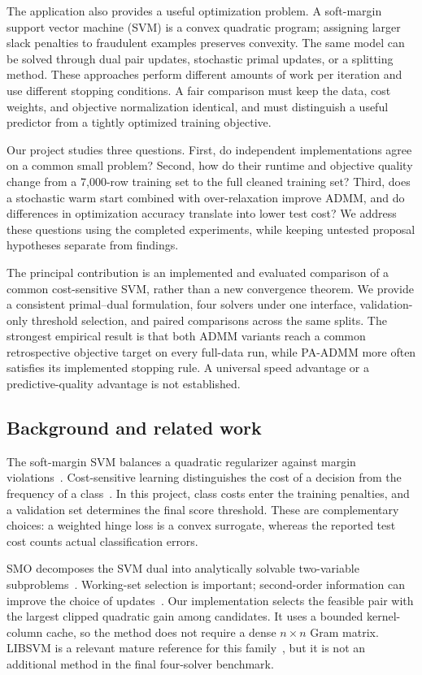 \documentclass{article}
\begin{document}
The application also provides a useful optimization problem. A soft-margin support vector machine (SVM) is a convex quadratic program; assigning larger slack penalties to fraudulent examples preserves convexity. The same model can be solved through dual pair updates, stochastic primal updates, or a splitting method. These approaches perform different amounts of work per iteration and use different stopping conditions. A fair comparison must keep the data, cost weights, and objective normalization identical, and must distinguish a useful predictor from a tightly optimized training objective.

Our project studies three questions. First, do independent implementations agree on a common small problem? Second, how do their runtime and objective quality change from a 7,000-row training set to the full cleaned training set? Third, does a stochastic warm start combined with over-relaxation improve ADMM, and do differences in optimization accuracy translate into lower test cost? We address these questions using the completed experiments, while keeping untested proposal hypotheses separate from findings.

The principal contribution is an implemented and evaluated comparison of a common cost-sensitive SVM, rather than a new convergence theorem. We provide a consistent primal--dual formulation, four solvers under one interface, validation-only threshold selection, and paired comparisons across the same splits. The strongest empirical result is that both ADMM variants reach a common retrospective objective target on every full-data run, while PA-ADMM more often satisfies its implemented stopping rule. A universal speed advantage or a predictive-quality advantage is not established.

\subsection{Background and related work}

The soft-margin SVM balances a quadratic regularizer against margin violations~\citep{cortes1995}. Cost-sensitive learning distinguishes the cost of a decision from the frequency of a class~\citep{elkan2001}. In this project, class costs enter the training penalties, and a validation set determines the final score threshold. These are complementary choices: a weighted hinge loss is a convex surrogate, whereas the reported test cost counts actual classification errors.

SMO decomposes the SVM dual into analytically solvable two-variable subproblems~\citep{platt1998}. Working-set selection is important; second-order information can improve the choice of updates~\citep{fan2005}. Our implementation selects the feasible pair with the largest clipped quadratic gain among candidates. It uses a bounded kernel-column cache, so the method does not require a dense $n\times n$ Gram matrix. LIBSVM is a relevant mature reference for this family~\citep{chang2011}, but it is not an additional method in the final four-solver benchmark.
\end{document}
